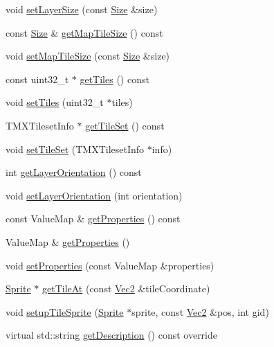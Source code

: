 \begin{DoxyCompactItemize}
void \hyperlink{classexperimental_1_1TMXLayer_a2448a36973d1f58f47136d5b6040f008}{set\+Layer\+Size} (const \hyperlink{classSize}{Size} \&size)
\item 
const \hyperlink{classSize}{Size} \& \hyperlink{classexperimental_1_1TMXLayer_a04180a8f4d7d96790212aabc959339de}{get\+Map\+Tile\+Size} () const
\item 
void \hyperlink{classexperimental_1_1TMXLayer_afc37ac1e61919a58fca4dfaf8b6e950b}{set\+Map\+Tile\+Size} (const \hyperlink{classSize}{Size} \&size)
\item 
const uint32\+\_\+t $\ast$ \hyperlink{classexperimental_1_1TMXLayer_aff7874cd19e0e387117b0f5c101c62f4}{get\+Tiles} () const
\item 
void \hyperlink{classexperimental_1_1TMXLayer_a8b38eb29a2a6cac31bdde2e78555dad0}{set\+Tiles} (uint32\+\_\+t $\ast$tiles)
\item 
T\+M\+X\+Tileset\+Info $\ast$ \hyperlink{classexperimental_1_1TMXLayer_a3a98b98dff7efe83ce30796eaf6f1a5f}{get\+Tile\+Set} () const
\item 
void \hyperlink{classexperimental_1_1TMXLayer_a864589e3f92c05635f7158922e884c98}{set\+Tile\+Set} (T\+M\+X\+Tileset\+Info $\ast$info)
\item 
int \hyperlink{classexperimental_1_1TMXLayer_a88cf778cbb137e03d2eec76d5f221825}{get\+Layer\+Orientation} () const
\item 
void \hyperlink{classexperimental_1_1TMXLayer_a0e2f58373e1e1124e7cb685ba57b6b20}{set\+Layer\+Orientation} (int orientation)
\item 
const Value\+Map \& \hyperlink{classexperimental_1_1TMXLayer_a1c2e4bb7d2ab4683b6c1d8c784b867bc}{get\+Properties} () const
\item 
Value\+Map \& \hyperlink{classexperimental_1_1TMXLayer_a356924361624560f9964aa9140a1f94a}{get\+Properties} ()
\item 
void \hyperlink{classexperimental_1_1TMXLayer_ad1a39654c70a971538a195ec861cb3f5}{set\+Properties} (const Value\+Map \&properties)
\item 
\hyperlink{classSprite}{Sprite} $\ast$ \hyperlink{classexperimental_1_1TMXLayer_a3766adcc9f0d3619c97620b7e1cf04dc}{get\+Tile\+At} (const \hyperlink{classVec2}{Vec2} \&tile\+Coordinate)
\item 
void \hyperlink{classexperimental_1_1TMXLayer_a17911c8c85544920fc1314eba15119cf}{setup\+Tile\+Sprite} (\hyperlink{classSprite}{Sprite} $\ast$sprite, const \hyperlink{classVec2}{Vec2} \&pos, int gid)
\item 
virtual std\+::string \hyperlink{classexperimental_1_1TMXLayer_ae03bc92e2f95a1c6cfce363a8abcfd77}{get\+Description} () const override

\end{DoxyCompactItemize}
